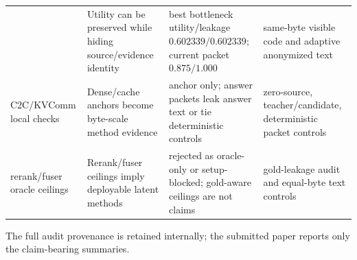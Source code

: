 \documentclass{article}
\begin{document}
\begin{longtable}[]{@{}llll@{}}
\begin{minipage}[t]{0.22\columnwidth}
\end{minipage} & \begin{minipage}[t]{0.22\columnwidth}\raggedright
Utility can be preserved while hiding source/evidence identity\strut
\end{minipage} & \begin{minipage}[t]{0.22\columnwidth}\raggedright
best bottleneck utility/leakage \(0.602339/0.602339\); current
packet \(0.875/1.000\)\strut
\end{minipage} & \begin{minipage}[t]{0.22\columnwidth}\raggedright
same-byte visible code and adaptive anonymized text\strut
\end{minipage}\tabularnewline
\begin{minipage}[t]{0.22\columnwidth}\raggedright
C2C/KVComm local checks\strut
\end{minipage} & \begin{minipage}[t]{0.22\columnwidth}\raggedright
Dense/cache anchors become byte-scale method evidence\strut
\end{minipage} & \begin{minipage}[t]{0.22\columnwidth}\raggedright
anchor only; answer packets leak answer text or tie deterministic
controls\strut
\end{minipage} & \begin{minipage}[t]{0.22\columnwidth}\raggedright
zero-source, teacher/candidate, deterministic packet controls\strut
\end{minipage}\tabularnewline
\begin{minipage}[t]{0.22\columnwidth}\raggedright
rerank/fuser oracle ceilings\strut
\end{minipage} & \begin{minipage}[t]{0.22\columnwidth}\raggedright
Rerank/fuser ceilings imply deployable latent methods\strut
\end{minipage} & \begin{minipage}[t]{0.22\columnwidth}\raggedright
rejected as oracle-only or setup-blocked; gold-aware ceilings are not
claims\strut
\end{minipage} & \begin{minipage}[t]{0.22\columnwidth}\raggedright
gold-leakage audit and equal-byte text controls\strut
\end{minipage}\tabularnewline
\bottomrule
\end{longtable}
\endgroup

The full audit provenance is retained internally; the submitted paper
reports only the claim-bearing summaries.
\end{document}
